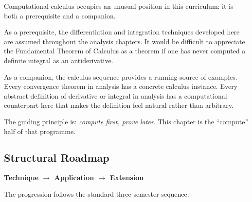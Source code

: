 \begin{tcolorbox}[
  colback=gray!6,
  colframe=gray!40,
  arc=2pt,
  left=8pt, right=8pt, top=6pt, bottom=6pt,
  title={\small\textbf{Structural Role: Calculus --- Fluency Before Rigour}},
  fonttitle=\small\bfseries
]
Computational calculus occupies an unusual position in this
curriculum: it is both a prerequisite and a companion.

As a prerequisite, the differentiation and integration
techniques developed here are assumed throughout the analysis
chapters.
It would be difficult to appreciate the Fundamental Theorem of
Calculus as a theorem if one has never computed a definite
integral as an antiderivative.

As a companion, the calculus sequence provides a running
source of examples.
Every convergence theorem in analysis has a concrete calculus
instance.
Every abstract definition of derivative or integral in analysis
has a computational counterpart here that makes the definition
feel natural rather than arbitrary.

The guiding principle is: \emph{compute first, prove later}.
This chapter is the ``compute'' half of that programme.
\end{tcolorbox}
\vspace{1em}

\subsection*{Structural Roadmap}

\begin{center}
\textbf{Technique $\longrightarrow$ Application $\longrightarrow$ Extension}
\end{center}

The progression follows the standard three-semester sequence:


